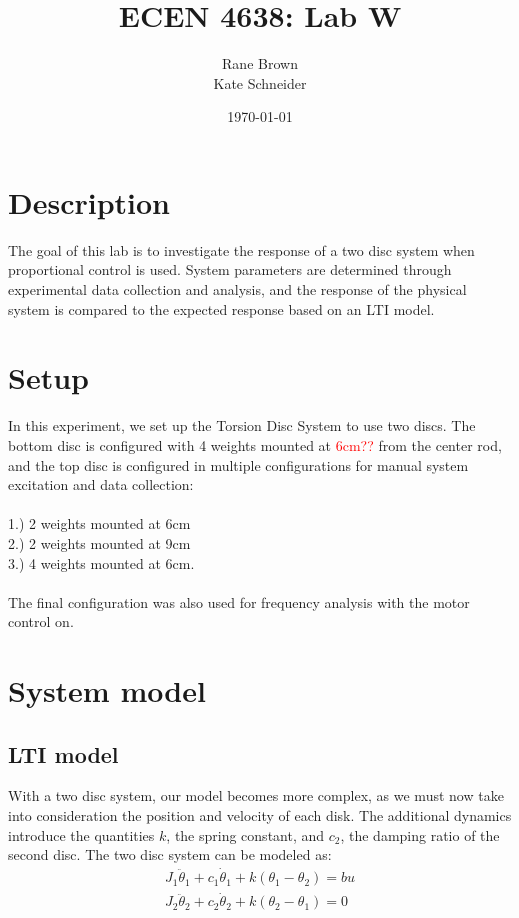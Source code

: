 \documentclass[11pt,titlepage]{article}
\author{Rane Brown \\ Kate Schneider}
\title{ECEN 4638: Lab W}
\date{\today}
\begin{document}
\maketitle
\tableofcontents
\listoffigures
\newpage

\section{Description}
The goal of this lab is to investigate the response of a two disc system when proportional control is used. System parameters are determined through experimental data collection and analysis, and the response of the physical system is compared to the expected response based on an LTI model.

\section{Setup}
In this experiment, we set up the Torsion Disc System to use two discs. The bottom disc is configured with 4 weights mounted at \textcolor{red}{6cm??} from the center rod, and the top disc is configured in multiple configurations for manual system excitation and data collection: \\\\
1.) 2 weights mounted at 6cm\\
2.) 2 weights mounted at 9cm\\
3.) 4 weights mounted at 6cm.\\\\
The final configuration was also used for frequency analysis with the motor control on.

\section{System model}
	\subsection{LTI model}	
	With a two disc system, our model becomes more complex, as we must now take into consideration the position and velocity of each disk. The additional dynamics introduce the quantities $k$, the spring constant, and $c_2$, the damping ratio of the second disc. The two disc system can be modeled as:
	\begin{align}
		J_1\ddot \theta_1+c_1\dot \theta_1+k(\theta_1-\theta_2)=bu \\
		J_2\ddot \theta_2+c_2\dot \theta_2+k(\theta_2-\theta_1)=0
	\end{align}
	
\end{document}
